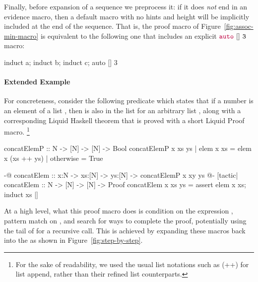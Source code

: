 Finally, before expansion of a sequence we preprocess it: if it does
{\em not} end in an evidence macro, then a default  macro
with no hints and height  will be implicitly included at the end
of the sequence. That is, the proof macro of
Figure~\ref{fig:assoc-min-macro} is equivalent to the following one
that includes an explicit ${\color{purple}\mathtt{auto}}~\mathtt{[]}~\mathtt{3}$ macro:
\begin{code}
  induct a; induct b; induct c; auto [] 3
\end{code}

\paragraph{Extended Example}

For concreteness, consider the following predicate which states that
if a number  is an element of a list , then  is
also in the list  for an arbitrary list , along
with a corresponding Liquid Haskell theorem that is proved with a short
Liquid Proof macro.
\footnote{For the sake of readability, we used the usual list
  notations such as (++) for list append, rather than their refined
  list counterparts.}%
%
\begin{code}
  concatElemP :: N -> [N] -> [N] -> Bool
  concatElemP x xs ys
    | elem x xs = elem x (xs ++ ys)
    | otherwise = True

  {-@ concatElem :: x:N -> xs:[N] -> ys:[N] ->
      {concatElemP x xy ys} @-}
  [tactic|
  concatElem :: N -> [N] -> [N] -> Proof
  concatElem x xs ys =
    assert {elem x xs};
    induct xs
  |]
\end{code}

At a high level, what this proof macro does is condition on the
expression , pattern match on , and search for
ways to complete the proof, potentially using the tail of  for
a recursive call. This is achieved by expanding these macros back into
the \LangB as shown in Figure~\ref{fig:step-by-step}.


